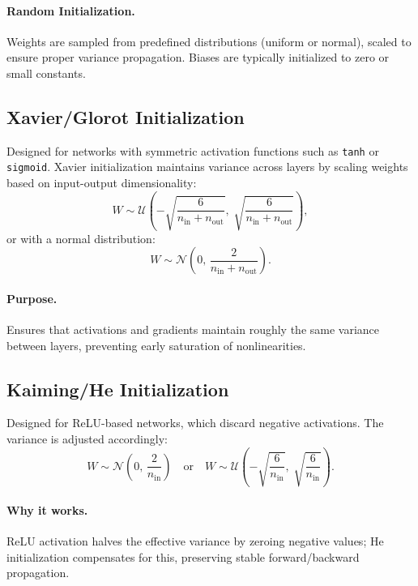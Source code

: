 \documentclass[12pt,a4paper]{report}
\begin{document}
\paragraph{Random Initialization.}
Weights are sampled from predefined distributions (uniform or normal), scaled to ensure proper variance propagation.  
Biases are typically initialized to zero or small constants.

\vspace{1em}
\subsection{Xavier/Glorot Initialization}

Designed for networks with symmetric activation functions such as \texttt{tanh} or \texttt{sigmoid}.  
Xavier initialization maintains variance across layers by scaling weights based on input-output dimensionality:
\[
W \sim \mathcal{U}\left(-\sqrt{\frac{6}{n_{\text{in}} + n_{\text{out}}}},\;
\sqrt{\frac{6}{n_{\text{in}} + n_{\text{out}}}}\right),
\]
or with a normal distribution:
\[
W \sim \mathcal{N}\left(0,\, \frac{2}{n_{\text{in}} + n_{\text{out}}}\right).
\]

\paragraph{Purpose.}
Ensures that activations and gradients maintain roughly the same variance between layers, preventing early saturation of nonlinearities.

\vspace{1em}
\subsection{Kaiming/He Initialization}

Designed for ReLU-based networks, which discard negative activations.  
The variance is adjusted accordingly:
\[
W \sim \mathcal{N}\left(0,\, \frac{2}{n_{\text{in}}}\right)
\quad \text{or} \quad
W \sim \mathcal{U}\left(-\sqrt{\frac{6}{n_{\text{in}}}},\;
\sqrt{\frac{6}{n_{\text{in}}}}\right).
\]

\paragraph{Why it works.}
ReLU activation halves the effective variance by zeroing negative values; He initialization compensates for this, preserving stable forward/backward propagation.

\vspace{1em}
\end{document}
